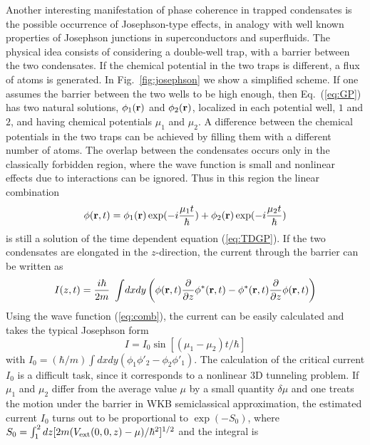 Another interesting manifestation of phase coherence in trapped
condensates is the possible occurrence of Josephson-type effects,
in analogy with well known properties of Josephson junctions in
superconductors and superfluids. The physical idea consists
of considering a double-well trap, with a barrier between the
two condensates. If the chemical  potential in the two traps is
different, a flux of atoms is generated.  In Fig.~\ref{fig:josephson}
we show a simplified scheme. If one assumes  the barrier between
the two wells to be high enough, then Eq.~(\ref{eq:GP})
has two natural solutions, $\phi_1 ({\bf r})$ and $\phi _2 ({\bf r})$,
localized in each potential well, $1$ and $2$, and having chemical
potentials $\mu_1$ and $\mu _2$. A difference between the chemical
potentials in the two traps can be achieved by filling them with a
different number of atoms. The overlap between the condensates occurs
only in the classically forbidden region, where the wave function is
small and nonlinear effects due to interactions can be ignored. Thus
in this region the linear combination
\begin{equation}
\phi({\bf r},t)=\phi_1({\bf r})\exp(-i\frac{\mu_1t}{\hbar})
+\phi_2({\bf r})\exp(-i\frac{\mu _2t}{\hbar})
\label{eq:comb}
\end{equation}
is still a solution of the time dependent equation (\ref{eq:TDGP}). If
the  two condensates are elongated  in the $z$-direction, the current
through the barrier can be written as
\begin{equation}
I(z,t) =\frac{i\hbar}{2m}\  \int\! dxdy \left( \phi ({\bf r},t)
\frac{\partial}{\partial z}\phi^* ({\bf r},t) -\phi^* ({\bf r},t)
\frac{\partial}{\partial z}\phi ({\bf r},t) \right)
 \label{eq:cur}
\end{equation}
Using the wave function (\ref{eq:comb}), the current can be easily
calculated and takes the typical Josephson form
\begin{equation}
I = I_0 \sin [ (\mu_1 - \mu _2 )t/\hbar ]
\label{eq:jos}
\end{equation}
with $I_0 = (\hbar /m) \int dxdy (\phi_1\phi'_2-\phi_2\phi'_1)$. The
calculation of the critical current $I_0$ is a difficult task,  since
it corresponds to a  nonlinear 3D  tunneling problem. If $\mu_1$ and
$\mu_2$ differ from the average value $\mu$ by a small quantity 
$\delta\mu$ and one treats the motion under the barrier in WKB 
semiclassical approximation, the estimated current $I_0$ turns out to 
be proportional to $\exp(- S_0)$, where  $S_0= \int_1^2 dz [ 2m 
(V_{\rm ext} (0,0,z) - \mu )/\hbar^2 ]^{1/2}$ and the integral is 
